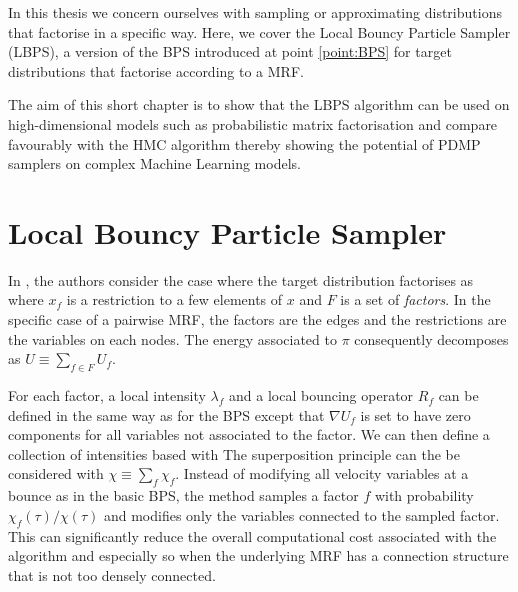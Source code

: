 
In this thesis we concern ourselves with sampling or approximating distributions that factorise in a specific way. Here, we cover the Local Bouncy Particle Sampler (LBPS), a version of the BPS introduced at point \ref{point:BPS} for target distributions that factorise according to a MRF.

The aim of this short chapter is to show that the LBPS algorithm can be used on high-dimensional models such as probabilistic matrix factorisation and compare favourably with the HMC algorithm thereby showing the potential of PDMP samplers on complex Machine Learning models.

\section{Local Bouncy Particle Sampler}
In \cite{bouchard15}, the authors consider the case where the target distribution factorises as
%
%
where $x_{f}$ is a restriction to a few elements of $x$ and $F$ is a set of \emph{factors}. In the specific case of a pairwise MRF, the factors are the edges and the restrictions are the variables on each nodes. The energy associated to $\pi$ consequently decomposes as $U\equiv \sum_{f\in F}U_{f}$.

For each factor, a local intensity $\lambda_{f}$ and a local bouncing operator $R_{f}$ can be defined in the same way as for the BPS except that $\nabla U_{f}$ is set to have zero components for all variables not associated to the factor. We can then define a collection of intensities based with
%
%
The superposition principle can the be considered with $\chi\equiv\sum_{f} \chi_{f}$. Instead of modifying all velocity variables at a bounce as in the basic BPS, the method samples a factor $f$ with probability $\chi_{f}(\tau)/\chi(\tau)$ and modifies only the variables connected to the sampled factor. 
This can significantly reduce the overall computational cost associated with the algorithm and especially so when the underlying MRF has a connection structure that is not too densely connected.

